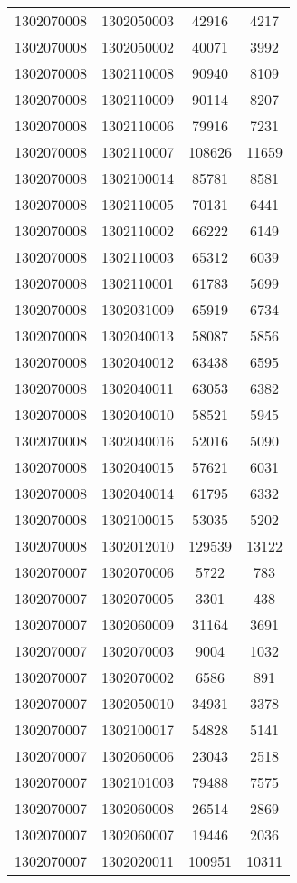 \begin{longtable}{llcc}
1302070008 & 1302050003 & 42916 & 4217\\
1302070008 & 1302050002 & 40071 & 3992\\
1302070008 & 1302110008 & 90940 & 8109\\
1302070008 & 1302110009 & 90114 & 8207\\
1302070008 & 1302110006 & 79916 & 7231\\
1302070008 & 1302110007 & 108626 & 11659\\
1302070008 & 1302100014 & 85781 & 8581\\
1302070008 & 1302110005 & 70131 & 6441\\
1302070008 & 1302110002 & 66222 & 6149\\
1302070008 & 1302110003 & 65312 & 6039\\
1302070008 & 1302110001 & 61783 & 5699\\
1302070008 & 1302031009 & 65919 & 6734\\
1302070008 & 1302040013 & 58087 & 5856\\
1302070008 & 1302040012 & 63438 & 6595\\
1302070008 & 1302040011 & 63053 & 6382\\
1302070008 & 1302040010 & 58521 & 5945\\
1302070008 & 1302040016 & 52016 & 5090\\
1302070008 & 1302040015 & 57621 & 6031\\
1302070008 & 1302040014 & 61795 & 6332\\
1302070008 & 1302100015 & 53035 & 5202\\
1302070008 & 1302012010 & 129539 & 13122\\
1302070007 & 1302070006 & 5722 & 783\\
1302070007 & 1302070005 & 3301 & 438\\
1302070007 & 1302060009 & 31164 & 3691\\
1302070007 & 1302070003 & 9004 & 1032\\
1302070007 & 1302070002 & 6586 & 891\\
1302070007 & 1302050010 & 34931 & 3378\\
1302070007 & 1302100017 & 54828 & 5141\\
1302070007 & 1302060006 & 23043 & 2518\\
1302070007 & 1302101003 & 79488 & 7575\\
1302070007 & 1302060008 & 26514 & 2869\\
1302070007 & 1302060007 & 19446 & 2036\\
1302070007 & 1302020011 & 100951 & 10311\\

\end{longtable}
